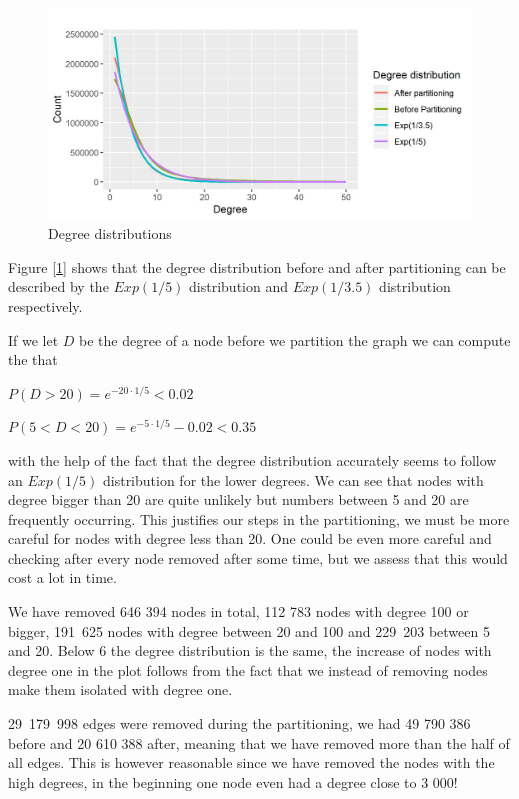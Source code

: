 \documentclass[a4paper,10pt]{article}
\newcommand\bref[1]{[\ref{#1}]}
\begin{document}
\begin{figure}[H]
	\centering
	\includegraphics[width=1\linewidth]{degexp.jpeg}
	\caption{Degree distributions}
	\label{fig:degexp}
\end{figure}

Figure \bref{fig:degexp} shows that the degree distribution before and after partitioning can be described by the $Exp(1/5)$ distribution and $Exp(1/3.5)$ distribution respectively.  

If we let $D$ be the degree of a node before we partition the graph we can compute the that

$P(D>20)=e^{-20\cdot 1/5}<0.02$

$P(5<D<20)=e^{-5 \cdot 1/5}-0.02<0.35$

with the help of the fact that the degree distribution accurately seems to follow an $Exp(1/5)$ distribution for the lower degrees. We can see that nodes with degree bigger than 20 are quite unlikely but numbers between 5 and 20 are frequently occurring. This justifies our steps in the partitioning, we must be more careful for nodes with degree less than 20. One could be even more careful and checking after every node removed after some time, but we assess that this would cost a lot in time. 

\medskip

We have removed 646 394 nodes in total, 112 783 nodes with degree 100 or bigger, 191 625‬ nodes with degree between 20 and 100 and 229 203‬ between 5 and 20. Below 6 the degree distribution is the same, the increase of nodes with degree one in the plot follows from the fact that we instead of removing nodes make them isolated with degree one.

\medskip

29 179 998 edges were removed during the partitioning, we had 49 790 386 before and 20 610 388 after, meaning that we have removed more than the half of all edges. This is however reasonable since we have removed the nodes with the high degrees, in the beginning one node even had a degree close to 3 000! 
\end{document}
